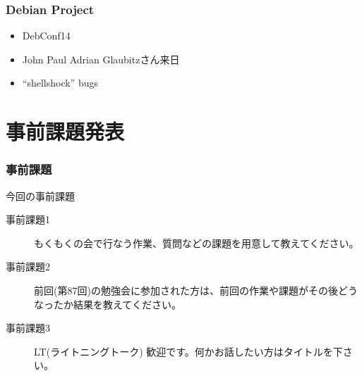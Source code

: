 \documentclass[cjk,dvipdfmx,10pt,compress,%
hyperref={bookmarks=true,bookmarksnumbered=true,bookmarksopen=false,%
colorlinks=false,%
pdftitle={第 88 回 関西 Debian 勉強会},%
pdfauthor={倉敷・のがた・佐々木・かわだ・八津尾},%
pdfsubject={資料},%
}]{beamer}
\begin{document}
\begin{frame}[fragile]
  \frametitle{Debian Project}
  \begin{itemize}
  \item DebConf14
  \item John Paul Adrian Glaubitzさん来日
  \item ``shellshock'' bugs
  \end{itemize}
\end{frame}


\section{事前課題発表}


\begin{frame}[fragile]
  \frametitle{事前課題}
  \begin{block}{今回の事前課題}
    \begin{description}
    \item[事前課題1]
      もくもくの会で行なう作業、質問などの課題を用意して教えてください。
    \item[事前課題2]
      前回(第87回)の勉強会に参加された方は、前回の作業や課題がその後どう
      なったか結果を教えてください。
    \item[事前課題3]
      LT(ライトニングトーク) 歓迎です。何かお話したい方はタイトルを下さい。
    \end{description}
  \end{block}
\end{frame}
\end{document}
